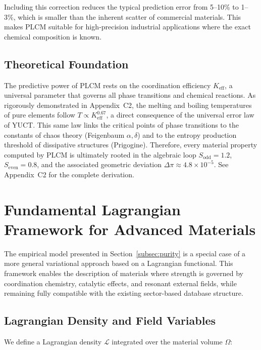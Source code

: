 \documentclass[12pt,a4paper]{article}
\begin{document}
	Including this correction reduces the typical prediction error from
	5–10\% to 1–3\%, which is smaller than the inherent scatter of commercial
	materials. This makes PLCM suitable for high‑precision industrial
	applications where the exact chemical composition is known.
	
	
	
\subsection{Theoretical Foundation}

The predictive power of PLCM rests on the coordination efficiency $K_{\mathrm{eff}}$,
a universal parameter that governs all phase transitions and chemical reactions.
As rigorously demonstrated in Appendix~C2, the melting and boiling temperatures of
pure elements follow $T \propto K_{\mathrm{eff}}^{0.67}$, a direct consequence of
the universal error law of YUCT.  This same law links the critical points of
phase transitions to the constants of chaos theory (Feigenbaum $\alpha,\delta$)
and to the entropy production threshold of dissipative structures (Prigogine).
Therefore, every material property computed by PLCM is ultimately rooted in
the algebraic loop $S_{\mathrm{odd}}=1.2$, $S_{\mathrm{even}}=0.8$, and the
associated geometric deviation $\Delta\pi \approx 4.8\times10^{-5}$.
See Appendix~C2 for the complete derivation.

	\section{Fundamental Lagrangian Framework for Advanced Materials}
	\label{sec:lagrangian}
	
	The empirical model presented in Section~\ref{subsec:purity} is a special case of a more general variational approach based on a Lagrangian functional. This framework enables the description of materials where strength is governed by coordination chemistry, catalytic effects, and resonant external fields, while remaining fully compatible with the existing sector-based database structure.
	
	\subsection{Lagrangian Density and Field Variables}
	\label{subsec:lagrangian-density}
	
	We define a Lagrangian density \(\mathcal{L}\) integrated over the material volume \(\Omega\):
	
\end{document}
